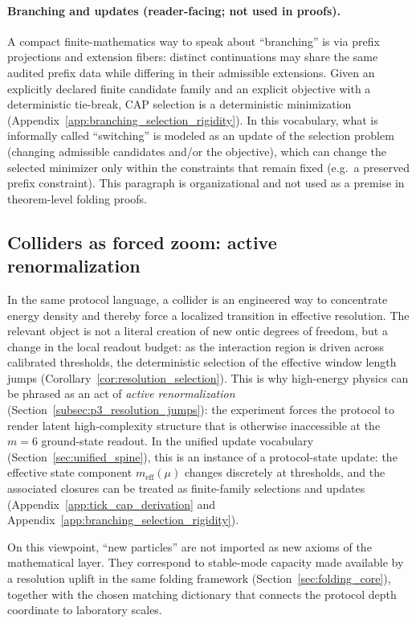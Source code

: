 \paragraph{Branching and updates (reader-facing; not used in proofs).}
\AuditTag A compact finite-mathematics way to speak about ``branching'' is via prefix projections and extension fibers:
distinct continuations may share the same audited prefix data while differing in their admissible extensions.
Given an explicitly declared finite candidate family and an explicit objective with a deterministic tie-break,
CAP selection is a deterministic minimization (Appendix~\ref{app:branching_selection_rigidity}).
In this vocabulary, what is informally called ``switching'' is modeled as an update of the selection problem
(changing admissible candidates and/or the objective), which can change the selected minimizer only within the constraints that remain fixed (e.g.\ a preserved prefix constraint).
This paragraph is organizational and not used as a premise in theorem-level folding proofs.

\subsection{Colliders as forced zoom: active renormalization}
\label{subsec:active_renormalization_synthesis}

In the same protocol language, a collider is an engineered way to concentrate energy density and thereby force a localized transition in effective resolution.
The relevant object is not a literal creation of new ontic degrees of freedom, but a change in the local readout budget: as the interaction region is driven across calibrated thresholds, the deterministic selection of the effective window length jumps (Corollary~\ref{cor:resolution_selection}).
This is why high-energy physics can be phrased as an act of \emph{active renormalization} (Section~\ref{subsec:p3_resolution_jumps}): the experiment forces the protocol to render latent high-complexity structure that is otherwise inaccessible at the $m=6$ ground-state readout.
\AuditTag In the unified update vocabulary (Section~\ref{sec:unified_spine}), this is an instance of a protocol-state update:
the effective state component $m_{\mathrm{eff}}(\mu)$ changes discretely at thresholds, and the associated closures can be treated as finite-family selections and updates (Appendix~\ref{app:tick_cap_derivation} and Appendix~\ref{app:branching_selection_rigidity}).

On this viewpoint, ``new particles'' are not imported as new axioms of the mathematical layer.
They correspond to stable-mode capacity made available by a resolution uplift in the same folding framework (Section~\ref{sec:folding_core}), together with the chosen matching dictionary that connects the protocol depth coordinate to laboratory scales.


